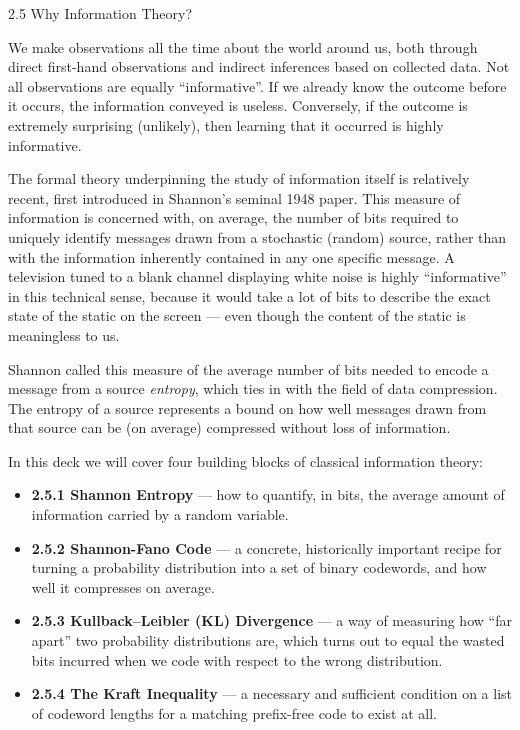 \documentclass[aspectratio=169,10pt]{beamer}
\begin{document}
\begin{frame}[allowframebreaks]{2.5 Why Information Theory?}

We make observations all the time about the world around us, both through
direct first-hand observations and indirect inferences based on collected
data. Not all observations are equally ``informative''. If we already know
the outcome before it occurs, the information conveyed is useless.
Conversely, if the outcome is extremely surprising (unlikely), then learning
that it occurred is highly informative.

The formal theory underpinning the study of information itself is relatively
recent, first introduced in Shannon's seminal 1948 paper. This measure of
information is concerned with, on average, the number of bits required to
uniquely identify messages drawn from a stochastic (random) source, rather
than with the information inherently contained in any one specific message.
A television tuned to a blank channel displaying white noise is highly
``informative'' in this technical sense, because it would take a lot of bits
to describe the exact state of the static on the screen --- even though the
content of the static is meaningless to us.

\bigskip
Shannon called this measure of the average number of bits needed to encode a
message from a source \emph{entropy}, which ties in with the field of data
compression. The entropy of a source represents a bound on how well messages
drawn from that source can be (on average) compressed without loss of
information.

\framebreak

In this deck we will cover four building blocks of classical information
theory:

\begin{itemize}
  \item \textbf{2.5.1 Shannon Entropy} --- how to quantify, in bits, the
    average amount of information carried by a random variable.
  \item \textbf{2.5.2 Shannon-Fano Code} --- a concrete, historically
    important recipe for turning a probability distribution into a set of
    binary codewords, and how well it compresses on average.
  \item \textbf{2.5.3 Kullback--Leibler (KL) Divergence} --- a way of
    measuring how ``far apart'' two probability distributions are, which
    turns out to equal the wasted bits incurred when we code with respect to
    the wrong distribution.
  \item \textbf{2.5.4 The Kraft Inequality} --- a necessary and sufficient
    condition on a list of codeword lengths for a matching prefix-free code
    to exist at all.
\end{itemize}


\end{frame}
\end{document}
